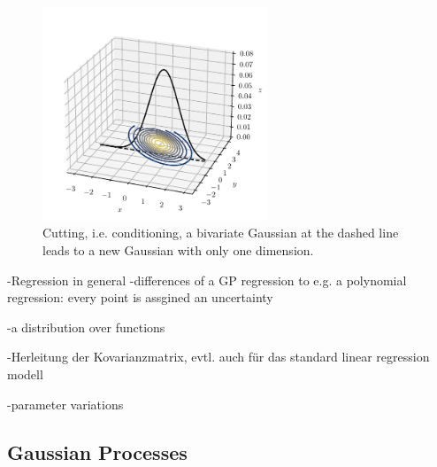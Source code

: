 \documentclass[%
  a4paper,oneside,%
  11pt,%
  smallchapters,
  green,%
  rgb, <cmyk>
  ]{tubsbook}
\begin{document}
%
%
\begin{figure}[h]
\begin{center}
\includegraphics[width=0.6\textwidth]{pics/Gaussians3dCut}
\caption{Cutting, i.e. conditioning, a bivariate Gaussian at the dashed line leads to a new Gaussian with only one dimension.}
\label{fig:GaussCut3d}
\end{center}
\end{figure}



-Regression in general
-differences of a GP regression to e.g. a polynomial regression: every point is assgined an uncertainty

-a distribution over functions

-Herleitung der Kovarianzmatrix, evtl. auch für das standard linear regression modell

-parameter variations

\subsection{Gaussian Processes}
\end{document}
